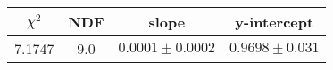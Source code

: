 \begin{tabular}{|c|c|c|c|}

\hline
$\chi^{2}$ & NDF & slope & y-intercept  \\
\hline
7.1747 & 9.0 & $0.0001\pm0.0002$ & $0.9698\pm0.031$ \\
\hline

\end{tabular}